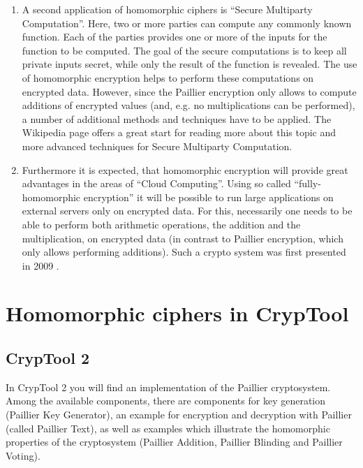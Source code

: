\begin{enumerate}
\item A second application of homomorphic ciphers is ``Secure Multiparty Computation''. Here, two or more parties can compute any commonly known function. Each of the parties provides one or more of the inputs for the function to be computed. The goal of the secure computations is to keep all private inputs secret, while only the result of the function is revealed. The use of homomorphic encryption helps to perform these computations on encrypted data. However, since the Paillier encryption only allows to compute additions of encrypted values (and, e.g. no multiplications can be performed), a number of additional methods and techniques have to be applied. The Wikipedia page \cite{hc:SMC} offers a great start for reading more about this topic and more advanced techniques for Secure Multiparty Computation.

\item Furthermore it is expected, that homomorphic encryption will provide great advantages in the areas of ``Cloud Computing''. Using so called ``fully-homomorphic encryption'' \cite{hc:HomEnc} it will be possible to run large applications on external servers only on encrypted data. For this, necessarily one needs to be able to perform both arithmetic operations, the addition and the multiplication, on encrypted data (in contrast to Paillier encryption, which only allows performing additions). Such a crypto system was first presented in 2009 \cite{hc:Gentry2009}.
\end{enumerate}

\section{Homomorphic ciphers in CrypTool}

\subsection{CrypTool 2}

In CrypTool 2 you will find an implementation of the Paillier cryptosystem. Among the available components, there are components for key generation (Paillier Key Generator), an example for encryption and decryption with Paillier (called Paillier Text), as well as examples which illustrate the homomorphic properties of the cryptosystem (Paillier Addition, Paillier Blinding and Paillier Voting).

